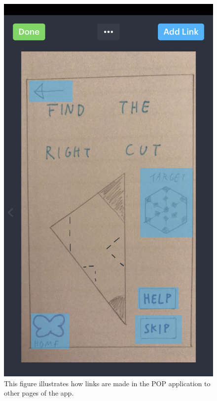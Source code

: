 \documentclass[11pt]{article}
\begin{document}
                \begin{figure}[!ht]
                        \begin{minipage}{0.45\textwidth}
                            \centering \includegraphics[width=0.7\linewidth]{Images/popLinks.PNG}
                            \caption{This figure illustrates how links are made in the POP application to other pages of the app.}
                            \label{fig:popLinks}
                        \end{minipage}\hfill
                        \begin{minipage}{0.45\textwidth}
                            \centering

\end{minipage}
\end{figure}
\end{document}
